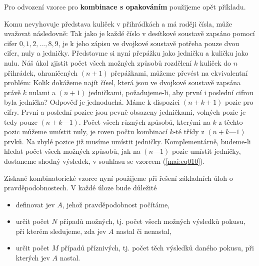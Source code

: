       Pro odvození vzorce pro \textbf{kombinace s opakováním} použijeme opět příkladu.
      
      
      Komu nevyhovuje představa kuliček v přihrádkách a má raději čísla, může uvažovat následovně: 
      Tak jako je každé číslo v desítkové soustavě zapsáno pomocí cifer \(0, 1, 2, \ldots , 8, 9\), 
      je k jeho zápisu ve dvojkové soustavě potřeba pouze dvou cifer, nuly a jedničky. Představme 
      si nyní přepážku jako jedničku a kuličku jako nulu. Náš úkol zjistit počet všech možných 
      způsobů rozdělení \(k\) kuliček do \(n\) přihrádek, ohraničených \((n+1)\) přepážkami, můžeme 
      převést na ekvivalentní problém: Kolik dokážeme najít čísel, která jsou ve dvojkové soustavě 
      zapsána právě \(k\) nulami a \((n + 1)\) jedničkami, požadujeme-li, aby první i poslední 
      cifrou byla jednička? Odpověď je jednoduchá. Máme k dispozici \((n+k+1)\) pozic pro cifry. 
      První a poslední pozice jsou pevně obsazeny jedničkami, volných pozic je tedy pouze \((n + k 
      — 1)\). Počet všech různých způsobů, kterými na \(k\) z těchto pozic můžeme umístit nuly, je 
      roven počtu kombinací \(k\)-té třídy z \((n + k — 1)\) prvků. Na zbylé pozice již musíme 
      umístit jedničky. Komplementárně, budeme-li hledat počet všech možných způsobů, jak na 
      \((n—1)\) pozic umístit jedničky, dostaneme shodný výsledek, v souhlasu se vzorcem 
      (\ref{mai:eq010}).
      
      
      
      Získané kombinatorické vzorce nyní použijeme při řešení základních úloh o pravděpodobnostech. 
      V každé úloze bude důležité
      \begin{itemize}
        \item definovat jev \(A\), jehož pravděpodobnost počítáme,
        \item určit počet \(N\) případů možných, tj. počet všech možných výsledků pokusu, při 
              kterém sledujeme, zda jev \(A\) nastal či nenastal,
        \item určit počet \(M\) případů příznivých, tj. počet těch výsledků daného pokusu, při 
              kterých jev \(A\) nastal.
      \end{itemize}

